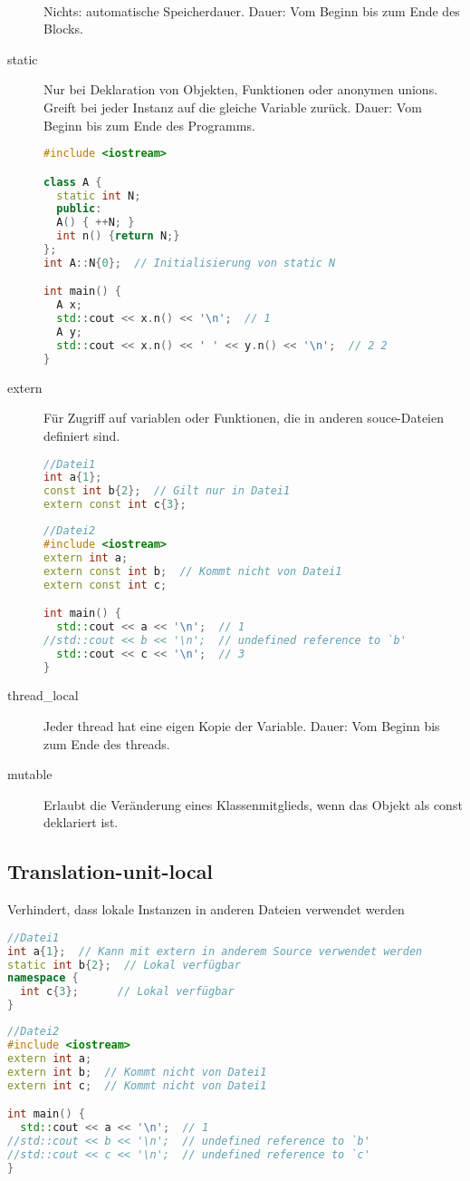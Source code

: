 \begin{description}
  \item[~] Nichts: automatische Speicherdauer. Dauer: Vom Beginn bis zum Ende des Blocks.
  \item[static] Nur bei Deklaration von Objekten, Funktionen oder anonymen
  unions. Greift bei jeder Instanz auf die gleiche Variable zurück. Dauer: Vom Beginn bis zum Ende des Programms.

\begin{lstlisting}[language=C++]
#include <iostream>

class A {
  static int N;
  public:
  A() { ++N; }
  int n() {return N;}
};
int A::N{0};  // Initialisierung von static N

int main() {
  A x;
  std::cout << x.n() << '\n';  // 1
  A y;
  std::cout << x.n() << ' ' << y.n() << '\n';  // 2 2
}
\end{lstlisting}

  \item[extern] Für Zugriff auf variablen oder Funktionen, die in anderen souce-Dateien definiert sind.

\begin{lstlisting}[language=C++]
//Datei1
int a{1};
const int b{2};  // Gilt nur in Datei1
extern const int c{3};
\end{lstlisting}
\begin{lstlisting}[language=C++]
//Datei2
#include <iostream>
extern int a;
extern const int b;  // Kommt nicht von Datei1
extern const int c;

int main() {
  std::cout << a << '\n';  // 1
//std::cout << b << '\n';  // undefined reference to `b'
  std::cout << c << '\n';  // 3
}
\end{lstlisting}

  \item[thread\_local] Jeder thread hat eine eigen Kopie der Variable. Dauer: Vom Beginn bis zum Ende des threads.
  \item[mutable] Erlaubt die Veränderung eines Klassenmitglieds, wenn das Objekt als const deklariert ist.
\end{description}

\subsection{Translation-unit-local}

Verhindert, dass lokale Instanzen in anderen Dateien verwendet werden

\begin{lstlisting}[language=C++]
//Datei1
int a{1};  // Kann mit extern in anderem Source verwendet werden
static int b{2};  // Lokal verfügbar
namespace {
  int c{3};      // Lokal verfügbar
}
\end{lstlisting}
\begin{lstlisting}[language=C++]
//Datei2
#include <iostream>
extern int a;
extern int b;  // Kommt nicht von Datei1
extern int c;  // Kommt nicht von Datei1

int main() {
  std::cout << a << '\n';  // 1
//std::cout << b << '\n';  // undefined reference to `b'
//std::cout << c << '\n';  // undefined reference to `c'
}
\end{lstlisting}

